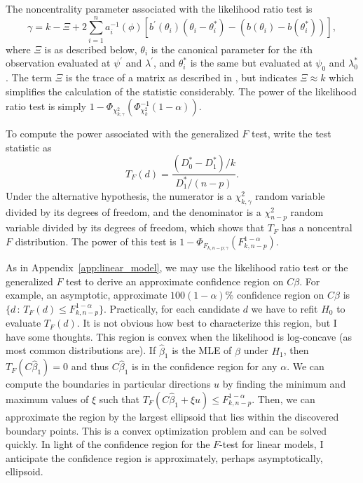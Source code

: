 \documentclass[12pt]{article}
\begin{document}
The noncentrality parameter associated with the likelihood ratio test is
\begin{displaymath}
   \gamma = k - \Xi + 2 \sum_{i=1}^n a_i^{-1}(\phi) \left[ b^\prime (\theta_i) \left( \theta_i - \theta_i^* \right) - \left( b(\theta_i) - b(\theta_i^*) \right) \right],
\end{displaymath}
where $\Xi$ is as described below, $\theta_i$ is the canonical parameter for the $i$th observation evaluated at $\psi^\prime$ and $\lambda^\prime$, and $\theta_i^*$ is the same but evaluated at $\psi_0$ and $\lambda_0^*$. The term $\Xi$ is the trace of a matrix as described in \cite{SMO:92}, but \cite{Shieh:00} indicates $\Xi \approx k$ which simplifies the calculation of the statistic considerably. The power of the likelihood ratio test is simply $1 - \Phi_{\chi_{k;\gamma}^2}\left( \Phi_{\chi_k^2}^{-1} ( 1 - \alpha ) \right)$.

To compute the power associated with the generalized $F$ test, write the test statistic as
\begin{displaymath}
   T_F(d) = \frac{(D_0^* - D_1^*) / k}{D_1^* / (n-p)}.
\end{displaymath}
Under the alternative hypothesis, the numerator is a $\chi_{k, \gamma}^2$ random variable divided by its degrees of freedom, and the denominator is a $\chi_{n-p}^2$ random variable divided by its degrees of freedom, which shows that $T_F$ has a noncentral $F$ distribution. The power of this test is $1 - \Phi_{F_{k, n-p; \gamma}}(F_{k, n-p}^{1 - \alpha})$.

As in Appendix~\ref{app:linear_model}, we may use the likelihood ratio test or the generalized $F$ test to derive an approximate confidence region on $C\beta$. For example, an asymptotic, approximate $100(1-\alpha)\%$ confidence region on $C\beta$ is $\{ d \, : \, T_F(d) \leq F_{k, n-p}^{1 - \alpha} \}$. Practically, for each candidate $d$ we have to refit $H_0$ to evaluate $T_F(d)$. It is not obvious how best to characterize this region, but I have some thoughts. This region is convex when the likelihood is log-concave (as most common distributions are). If $\hat{\beta}_1$ is the MLE of $\beta$ under $H_1$, then $T_F(C \hat{\beta}_1) = 0$ and thus $C \hat{\beta}_1$ is in the confidence region for any $\alpha$. We can compute the boundaries in particular directions $u$ by finding the minimum and maximum values of $\xi$ such that $T_F(C \hat{\beta}_1 + \xi u) \leq F_{k, n-p}^{1 - \alpha}$. Then, we can approximate the region by the largest ellipsoid that lies within the discovered boundary points. This is a convex optimization problem and can be solved quickly. In light of the confidence region for the $F$-test for linear models, I anticipate the confidence region is approximately, perhaps asymptotically, ellipsoid.
\end{document}
